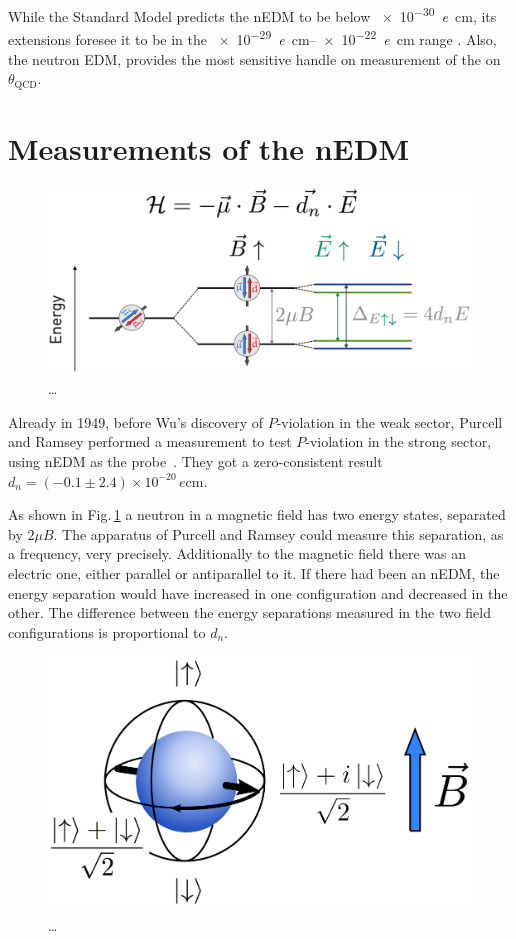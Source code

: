 While the Standard Model predicts the nEDM to be below \SI{e-30}{\elementarycharge\centi\meter}, its extensions foresee it to be in the \SIrange[range-phrase = --]{e-29}{e-22}{\elementarycharge\centi\meter} range . Also, the neutron EDM, provides the most sensitive handle on measurement of the on $\theta_\text{QCD}$.



\section{Measurements of the nEDM}

\begin{figure}
  \centering
  \includegraphics[width=\linewidth]{gfx/nEDMatPSI/measurement_principle.png}
  \caption{\ldots}
  \label{fig:nEDM_measurement_principle}
\end{figure}

Already in 1949, before Wu's discovery of $P$-violation in the weak sector, Purcell and Ramsey performed a measurement to test $P$-violation in the strong sector, using nEDM as the probe~\cite{PhysRev.108.120}. They got a zero-consistent result $d_n = (-0.1 \pm 2.4) \times 10^{-20}\,\si{\elementarycharge\centi\meter}$.

As shown in Fig.\,\ref{fig:nEDM_measurement_principle} a neutron in a magnetic field has two energy states, separated by $2 \mu B$. The apparatus of Purcell and Ramsey could measure this separation, as a frequency, very precisely. Additionally to the magnetic field there was an electric one, either parallel or antiparallel to it. If there had been an nEDM, the energy separation would have increased in one configuration and decreased in the other. The difference between the energy separations measured in the two field configurations is proportional to $d_n$.

\begin{figure}
  \centering
  \includegraphics[width=.6\linewidth]{gfx/nEDMatPSI/bloch_sphere.png}
  \caption{\ldots}
  \label{fig:nEDM_bloch_sphere}
\end{figure}


